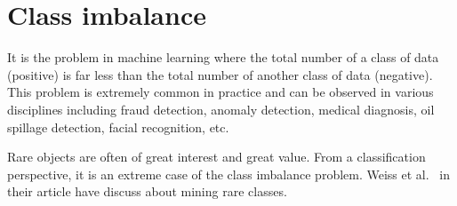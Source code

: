 \documentclass{book}
\begin{document}
\section{Class imbalance}
It is the problem in machine learning where the total number of a class of data (positive) is far less than the total number of another class of data (negative). This problem is extremely common in practice and can be observed in various disciplines including fraud detection, anomaly detection, medical diagnosis, oil spillage detection, facial recognition, etc.

Rare objects are often of great interest and great value. From a classification perspective, it is an extreme case of the class imbalance problem. Weiss et al.\ \cite{DBLP:journals/sigkdd/Weiss04} in their article have discuss about mining rare classes.
\end{document}
